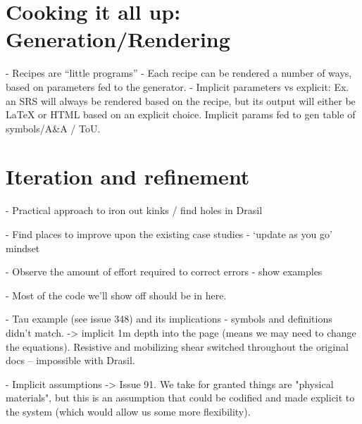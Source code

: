 \section{Cooking it all up: Generation/Rendering}
  - Recipes are “little programs”
  - Each recipe can be rendered a number of ways, based on parameters fed to the generator.
  -  Implicit parameters vs explicit: Ex. an SRS will always be rendered based on the recipe, but its output will either be LaTeX or HTML based on an explicit choice. Implicit params fed to gen table of symbols/A\&A / ToU.


\section{Iteration and refinement}

  - Practical approach to iron out kinks / find holes in Drasil

  - Find places to improve upon the existing case studies - ‘update as you go’ 
  mindset

  - Observe the amount of effort required to correct errors - show examples

  - Most of the code we’ll show off should be in here.

  - Tau example (see issue 348) and its implications - symbols and definitions 
  didn't match. -> implicit 1m depth into the page (means we may need to change 
  the equations). Resistive and mobilizing shear switched throughout the 
  original docs -- impossible with Drasil.

  -  Implicit assumptions -> 
  Issue 91. We take for granted things are "physical 
  materials", but this is an assumption that could be codified and made 
  explicit to the system (which would allow us some more flexibility).